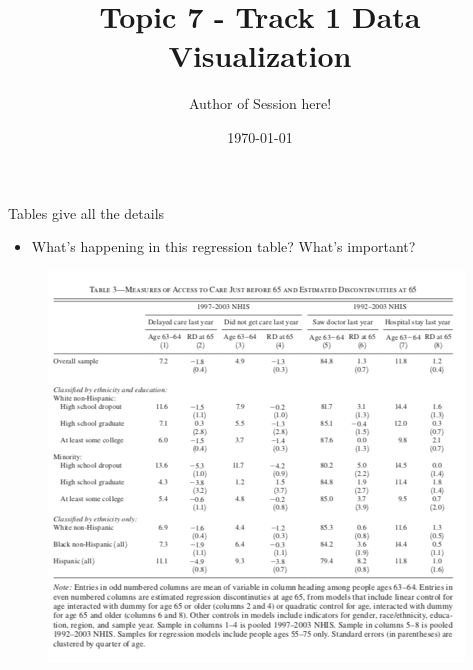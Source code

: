 \documentclass[aspectratio=169]{beamer}
\title{Topic 7 - Track 1 \newline Data Visualization}
\date{\today}
\author{Author of Session here!} %
\institute{Development Impact Evaluation (DIME) \newline The World Bank }
\begin{document}
	
	{
		\maketitle
	}

\begin{frame}[fragile]{Tables give all the details}

\begin{multicols}{2}	
	\begin{itemize}
		\item What’s happening in this regression table? What’s important?		
	\end{itemize}
	\begin{figure}
		\centering
		\includegraphics[width=\linewidth]{img/regtable}
	\end{figure}
\end{multicols}
\end{frame}
\end{document}
